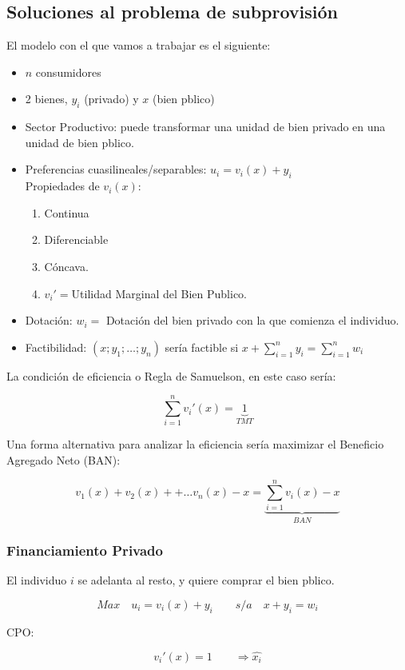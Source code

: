 \subsection{Soluciones al problema de subprovisión}

El modelo con el que vamos a trabajar es el siguiente:

\begin{itemize}
	\item $n$ consumidores
	\item 2 bienes, $y_i$ (privado) y $x$ (bien pblico)
	\item Sector Productivo: puede transformar una unidad de bien privado en una unidad de bien pblico.
	\item Preferencias cuasilineales/separables: $u_i=v_i(x)+y_i$ \\
	Propiedades de $v_i(x)$:
		\begin{enumerate}
			\item Continua
			\item Diferenciable
			\item Cóncava.
			\item $v_i '=$Utilidad Marginal del Bien Publico.
		\end{enumerate}
	\item Dotación: $w_i=$ Dotación del bien privado con la que comienza el individuo.
	\item Factibilidad: $(x;y_1; \dots ; y_n)$ sería factible si $x+\sum_{i=1}^{n}y_i=\sum_{ i=1}^{n}w_i$
\end{itemize}

La condición de eficiencia o Regla de Samuelson, en este caso sería:

$$\sum_{i=1}^{n}v_i ' (x)=\underbrace{1}_{TMT}$$

Una forma alternativa para analizar la eficiencia sería maximizar el Beneficio Agregado Neto (BAN):

$$v_1(x)+v_2(x)++ \ldots v_n(x)-x = \underbrace{\sum_{i=1}^{n} v_i(x)-x}_{BAN}$$

\subsubsection{Financiamiento Privado}

El individuo $i$ se adelanta al resto, y quiere comprar el bien pblico.

$$ Max \quad u_i=v_i(x)+y_i \qquad s/a \quad x+y_i=w_i$$

CPO:

$$v_i ' (x)=1 \qquad \Rightarrow \widehat{x_i}$$

